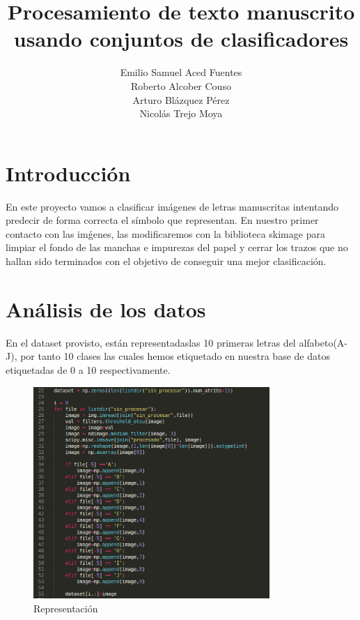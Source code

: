 \documentclass[0pt]{esannV2}
\begin{document}
\title{Procesamiento de texto manuscrito usando conjuntos de clasificadores}

\author{
Emilio Samuel Aced Fuentes \\
Roberto Alcober Couso \\
Arturo Bl\'azquez P\'erez \\
Nicol\'as Trejo Moya \\
}

\maketitle

\section{Introducci\'on}
En este proyecto vamos a clasificar im\'agenes de letras manuscritas intentando predecir de forma correcta el s\'imbolo que representan.
En nuestro primer contacto con las im\'genes, las modificaremos con la biblioteca skimage para limpiar el fondo de las manchas e impurezas del papel y cerrar los trazos que no hallan sido terminados con el objetivo de conseguir una mejor clasificaci\'on.



\section{An\'alisis de los datos}
En el dataset provisto, est\'an representadaslas 10 primeras letras del alfabeto(A-J), por tanto 10 clases las cuales hemos etiquetado en nuestra base de datos etiquetadas de 0 a 10 respectivamente.

\begin{figure}[htbp]
\centering
    \includegraphics[width=0.8\textwidth,natwidth=906,natheight=600]{./representacion.png}
    \caption{Representaci\'on}
\end{figure}
\end{document}
